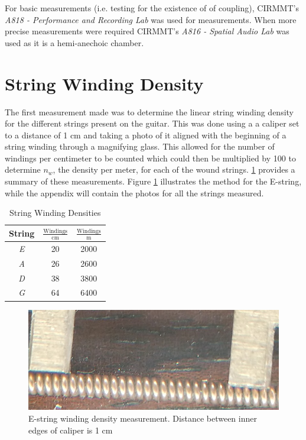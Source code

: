 \documentclass[../main.tex]{subfiles}
\begin{document}
For basic measurements (i.e. testing for the existence of of coupling), CIRMMT's \emph{A818 - Performance and Recording Lab} was used for measurements. When more precise measurements were required CIRMMT's \emph{A816 - Spatial Audio Lab} was used as it is a hemi-anechoic chamber.

\section{String Winding Density}
The first measurement made was to determine the linear string winding density for the different strings present on the guitar. This was done using a a caliper set to a distance of 1 cm and taking a photo of it aligned with the beginning of a string winding through a magnifying glass. This allowed for the number of windings per centimeter to be counted which could then be multiplied by 100 to determine $n_w$, the density per meter, for each of the wound strings. \ref{tab:WindingDensities} provides a summary of these measurements. Figure \ref{fig:EWindings} illustrates the method for the E-string, while the appendix will contain the photos for all the strings measured.

\begin{table}[h]
\centering
    \begin{tabular}{||c|| c| c||} 
        \hline
        String & $\frac{\text{Windings}}{\text{cm}}$ & $\frac{\text{Windings}}{\text{m}}$ \\ [0.5ex] 
        \hline
        \hline
        \emph{E} & 20 & 2000 \\ 
        \hline
        \emph{A} & 26 & 2600 \\
        \hline
        \emph{D} & 38 & 3800 \\ 
        \hline
        \emph{G} & 64 & 6400 \\ 
        \hline
    \end{tabular}
\caption{String Winding Densities}
\label{tab:WindingDensities}
\end{table}

\begin{figure}[h]
    \centering
    \includegraphics[scale=.75]{./images/pictures/WindingsEZoom.png}
    \caption{E-string winding density measurement. Distance between inner edges of caliper is 1 cm}
    \label{fig:EWindings}
\end{figure}
\end{document}
